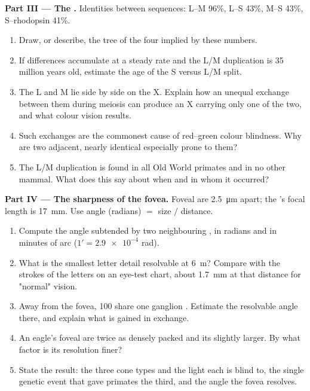 \begin{problem}
\medskip
\noindent\textbf{Part III --- The .}
Identities between   sequences: L--M 96\%, L--S 43\%, M--S
43\%, S--rhodopsin 41\%.
\begin{enumerate}[resume]
  \item Draw, or describe, the tree of the four  implied by these
        numbers.
  \item If differences accumulate at a steady rate and the L/M
        duplication is 35 million years old, estimate the age of the
        S versus L/M split.
  \item The L and M  lie side by side on the X. Explain how an
        unequal exchange between them during meiosis can produce an X
        carrying only one of the two, and what colour vision results.
  \item Such exchanges are the commonest cause of red--green colour
        blindness. Why are two adjacent, nearly identical 
        especially prone to them?
  \item The L/M duplication is found in all Old World primates and in
        no other mammal. What does this say about when and in whom it
        occurred?
\end{enumerate}

\medskip
\noindent\textbf{Part IV --- The sharpness of the fovea.}
Foveal  are \qty{2.5}{\micro m} apart; the 's focal length is
\qty{17}{mm}. Use angle (radians) $=$ size $/$ distance.
\begin{enumerate}[resume]
  \item Compute the angle subtended by two neighbouring , in
        radians and in minutes of arc ($1' = \num{2.9e-4}$ rad).
  \item What is the smallest letter detail resolvable at \qty{6}{m}?
        Compare with the strokes of the letters on an eye-test chart,
        about \qty{1.7}{mm} at that distance for "normal" vision.
  \item Away from the fovea, 100  share one ganglion .
        Estimate the resolvable angle there, and explain what is
        gained in exchange.
  \item An eagle's foveal  are twice as densely packed and its
         slightly larger. By what factor is its resolution finer?
  \item State the result: the three cone types and the light each is
        blind to, the single genetic event that gave primates the
        third, and the angle the fovea resolves.
\end{enumerate}
\end{problem}
